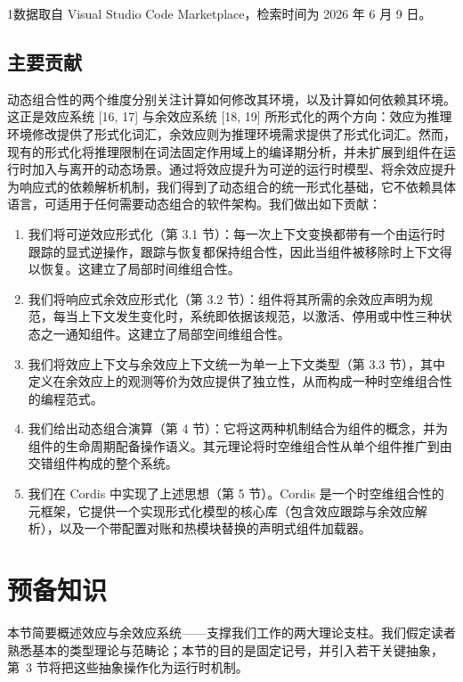 \documentclass[
  10
]{article}
\begin{document}
1数据取自 Visual Studio Code Marketplace，检索时间为 2026 年 6 月 9 日。

\subsection{主要贡献} \label{contributions}

动态组合性的两个维度分别关注计算如何修改其环境，以及计算如何依赖其环境。这正是效应系统 {[}16, 17{]} 与余效应系统 {[}18, 19{]} 所形式化的两个方向：效应为推理环境修改提供了形式化词汇，余效应则为推理环境需求提供了形式化词汇。然而，现有的形式化将推理限制在词法固定作用域上的编译期分析，并未扩展到组件在运行时加入与离开的动态场景。通过将效应提升为可逆的运行时模型、将余效应提升为响应式的依赖解析机制，我们得到了动态组合的统一形式化基础，它不依赖具体语言，可适用于任何需要动态组合的软件架构。我们做出如下贡献：

\begin{enumerate}
\def\labelenumi{\arabic{enumi}.}
\item
  我们将可逆效应形式化（第 3.1 节）：每一次上下文变换都带有一个由运行时跟踪的显式逆操作，跟踪与恢复都保持组合性，因此当组件被移除时上下文得以恢复。这建立了局部时间维组合性。
\item
  我们将响应式余效应形式化（第 3.2 节）：组件将其所需的余效应声明为规范，每当上下文发生变化时，系统即依据该规范，以激活、停用或中性三种状态之一通知组件。这建立了局部空间维组合性。
\item
  我们将效应上下文与余效应上下文统一为单一上下文类型（第 3.3 节），其中定义在余效应上的观测等价为效应提供了独立性，从而构成一种时空维组合性的编程范式。
\item
  我们给出动态组合演算（第 4 节）：它将这两种机制结合为组件的概念，并为组件的生命周期配备操作语义。其元理论将时空维组合性从单个组件推广到由交错组件构成的整个系统。
\item
  我们在 Cordis 中实现了上述思想（第 5 节）。Cordis 是一个时空维组合性的元框架，它提供一个实现形式化模型的核心库（包含效应跟踪与余效应解析），以及一个带配置对账和热模块替换的声明式组件加载器。
\end{enumerate}
\section{预备知识} \label{preliminaries}

本节简要概述效应与余效应系统——支撑我们工作的两大理论支柱。我们假定读者
熟悉基本的类型理论与范畴论；本节的目的是固定记号，并引入若干关键抽象，
第~3 节将把这些抽象操作化为运行时机制。
\end{document}
